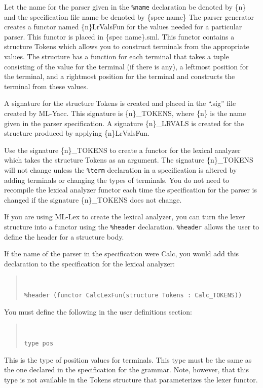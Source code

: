 Let the name for
the parser given in the {\tt \%name} declaration be denoted by \{n\} and
the specification file name be denoted by \{spec name\}
The parser generator creates a functor named \{n\}LrValsFun for
the values needed for a particular parser.  This functor is placed
in \{spec name\}.sml.  This
functor contains a structure
Tokens which allows you to construct terminals from the appropriate
values.  The structure has a function for each terminal that takes a tuple
consisting of  the value for the terminal (if there is any), a leftmost
position for the terminal, and a rightmost position for the terminal and
constructs the terminal from these values.

A signature for the structure Tokens is created and placed in the ``.sig''
file created by ML-Yacc.  This signature is \{n\}\_TOKENS,
 where \{n\} is
the name given in the parser specification.  A signature
\{n\}\_LRVALS is created for the structure produced by
applying \{n\}LrValsFun.

Use the signature \{n\}\_TOKENS to create a functor for the
lexical analyzer which takes the structure Tokens as an argument.  The
signature \{n\}\_TOKENS
will not change unless the {\tt \%term} declaration in a
specification is altered by adding terminals or
changing the types of terminals.  You do not need to recompile
the lexical analyzer functor each time the specification for
the parser is changed if the
signature \{n\}\_TOKENS does not change.

If you are using ML-Lex to create the lexical analyzer, you
can turn the lexer structure into a functor using the
{\tt \%header} declaration.
{\tt \%header} allows the user to define the header for a structure body.

If the name of the parser in the specification were Calc, you
would add this declaration to the specification for the lexical 
analyzer:
\begin{quote}
\tt
\begin{verbatim}
%header (functor CalcLexFun(structure Tokens : Calc_TOKENS))
\end{verbatim}
\end{quote}

You must define the following in the user definitions section:
\begin{quote}
\tt
\begin{verbatim}
type pos
\end{verbatim}
\end{quote}
This is the type of position values for terminals.  This type
must be the same as the one declared in the specification for
the grammar.  Note, however, that this type is not available
in the Tokens structure that parameterizes the lexer functor.


